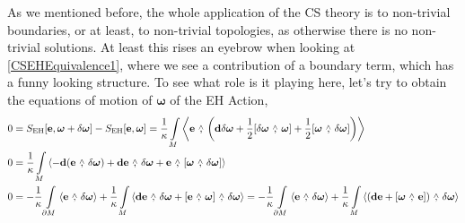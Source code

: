 As we mentioned before, the whole application of the CS theory is to non-trivial boundaries, or at least, to non-trivial 
topologies, as otherwise there is no non-trivial solutions. At least this rises an eyebrow when looking at \eqref{CSEHEquivalence1}, where we see a 
contribution of a boundary term, which has a funny looking structure. To see what role is it playing here, let's try to obtain the equations of motion 
of $\boldsymbol\omega$ of the EH Action,
\begin{align*}
    0&=S_{\textnormal{EH}}\qty[\vb e,\boldsymbol\omega+\delta\boldsymbol\omega]-S_{\textnormal{EH}}\qty[\vb e,\boldsymbol\omega]=\frac1\kappa\int\limits_M\expval{\vb e\ \wedgecomma\ \qty(\vb d\delta\boldsymbol\omega+\frac12\wedgecomm{\delta\boldsymbol\omega}{\boldsymbol\omega}+\frac12\wedgecomm{\boldsymbol\omega}{\delta\boldsymbol\omega})}\\
    0&=\frac1\kappa\int\limits_M\expval{-\vb d\qty(\vb e\ \wedgecomma\ \delta\boldsymbol\omega)+\vb d\vb e\ \wedgecomma\ \delta\boldsymbol\omega+\vb e\ \wedgecomma\ \wedgecomm{\boldsymbol\omega}{\delta\boldsymbol\omega}}\\
    0&=-\frac1\kappa\int\limits_{\partial M}\expval{\vb e\ \wedgecomma\ \delta\boldsymbol\omega}+\frac1\kappa\int\limits_M\expval{\vb d\vb e\ \wedgecomma\ {\delta\boldsymbol\omega}+\wedgecomm{\vb e}{\boldsymbol\omega}\ \wedgecomma\ {\delta\boldsymbol\omega}}=-\frac1\kappa\int\limits_{\partial M}\expval{\vb e\ \wedgecomma\ \delta\boldsymbol\omega}+\frac1\kappa\int\limits_M\expval{\qty(\vb d\vb e+\wedgecomm{\boldsymbol\omega}{\vb e})\ \wedgecomma\ {\delta\boldsymbol\omega}}
\end{align*}

